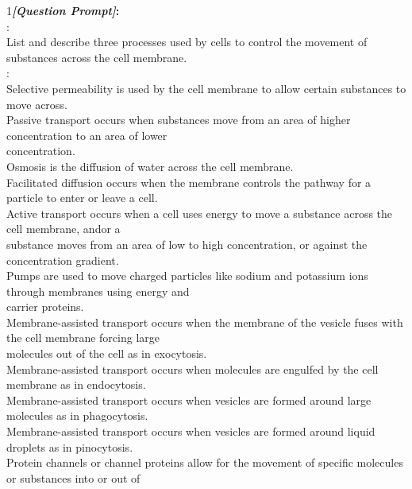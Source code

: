 \begin{figure*}
\begin{tcolorbox}[
    colback=gray!10,      %
    colframe=gray!80,     %
    title=Case Study 2,
    fonttitle=\bfseries,  %
    rounded corners,
    boxrule=0.5mm,        %
    width=\linewidth
]
\scriptsize
\textcircled{\raisebox{-0.3pt} {\scriptsize1}}\textbf{\emph{[Question Prompt]}:}\\
\text{[Question]}: \\
List and describe three processes used by cells to control the movement of substances across the cell membrane.\\
:\\
Selective permeability is used by the cell membrane to allow certain substances to move across.\\
Passive transport occurs when substances move from an area of higher concentration to an area of lower\\
concentration.\\
Osmosis is the diffusion of water across the cell membrane.\\
Facilitated diffusion occurs when the membrane controls the pathway for a particle to enter or leave a cell.\\
Active transport occurs when a cell uses energy to move a substance across the cell membrane, and\/or a\\
substance moves from an area of low to high concentration, or against the concentration gradient.\\
Pumps are used to move charged particles like sodium and potassium ions through membranes using energy and\\
carrier proteins.\\
Membrane-assisted transport occurs when the membrane of the vesicle fuses with the cell membrane forcing large\\
molecules out of the cell as in exocytosis.\\
Membrane-assisted transport occurs when molecules are engulfed by the cell membrane as in endocytosis.\\
Membrane-assisted transport occurs when vesicles are formed around large molecules as in phagocytosis.\\
Membrane-assisted transport occurs when vesicles are formed around liquid droplets as in pinocytosis.\\
Protein channels or channel proteins allow for the movement of specific molecules or substances into or out of\\

\end{tcolorbox}
\end{figure*}
